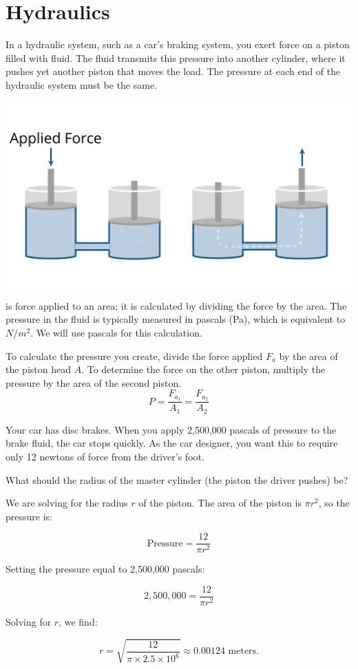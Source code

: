 \section{Hydraulics}

In a hydraulic system, such as a car's braking system, you exert force on a 
piston filled with fluid. The fluid transmits this pressure into another 
cylinder, where it pushes yet another piston that moves the load. The pressure 
at each end of the hydraulic system must be the same. 

\includegraphics[width=\textwidth]{hydraulicsNew.png}

 is force applied to an area; it is calculated by dividing 
the force by the area.  The pressure in the fluid is typically measured in 
pascals (Pa), which is equivalent to \(N / m^2\). We will use pascals for this 
calculation.

To calculate the pressure you create, divide the force applied $F_{a}$ by the 
area of the piston head $A$. To determine the force on the other piston, 
multiply the pressure by the area of the second piston.
\[
P = \frac{F_{a_1}}{A_1} = \frac{F_{a_2}}{A_2}
\]


\begin{Exercise}[title={Hydraulics}, label=hydraulics]
Your car has disc brakes. When you apply 2,500,000 pascals of pressure to the 
brake fluid, the car stops quickly. As the car designer, you want this to 
require only 12 newtons of force from the driver's foot.

What should the radius of the master cylinder (the piston the driver pushes) be?
\end{Exercise}
\begin{Answer}[ref=hydraulics]
We are solving for the radius \( r \) of the piston. The area of the piston is 
\( \pi r^2 \), so the pressure is:

\[
\text{Pressure} = \frac{12}{\pi r^2}
\]

Setting the pressure equal to 2,500,000 pascals:

\[
2,500,000 = \frac{12}{\pi r^2}
\]

Solving for \( r \), we find:

\[
r = \sqrt{\frac{12}{\pi \times 2.5 \times 10^6}} \approx 0.00124 \text{ meters}.
\]
\end{Answer}

